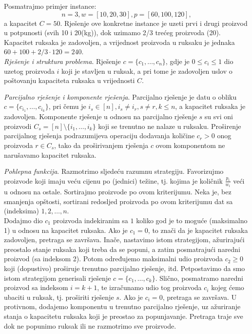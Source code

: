 \begin{solution}
	Posmatrajmo primjer instance: $$n = 3, w = [10, 20, 30], p = [60, 100, 120],$$  a 
	kapacitet $C = 50$.  Rješenje ove konkretne instance je uzeti prvi i drugi proizvod u potpunosti (svih 10 i
	20(kg)), dok uzimamo 2/3 trećeg proizvoda (20). Kapacitet ruksaka je zadovoljen,
	a vrijednost proizvoda u ruksaku je jednaka $60 + 100 + 2/3 \cdot  120
	= 240$. \\
	
    \textit{Rješenje i struktura problema}.  Rješenje $c = \{c_1,\ldots, c_n\}$, gdje je $0 \leq c_i \leq 1$ dio uzetog
    proizvoda $i$ koji je stavljen u ruksak, a pri tome je zadovoljen  uslov o poštovanju kapaciteta ruksaka u vrijednosti   $C$.
    
    \textit{Parcijalno rješenje i komponente rješenja}. Parcijalno rješenje je datu o obliku $c = \{ c_{i_1}, \ldots, c_{i_k}  \}$, pri čemu je $i_s \in [n],  i_s \neq i_r, s\neq r,   k \leq n$, a kapacitet ruksaka je zadovoljen. 
    Komponente rješenje u odnosu na parcijalno rješenje $s$ su svi oni proizvodi $C_s = [n] \setminus \{  {i_1}, \ldots, {i_k} \}$ koji se trenutno ne nalaze   u ruksaku. Proširenje parcijalnog rješenja podrazumijeva operaciju dodavanja  količine $c_r>0$ onog proizvoda $r \in C_s$, tako da proširivanjem rješenja $c$ ovom komponentom ne narušavamo kapacitet ruksaka. 
    
    \textit{Pohlepna funkcija}.  Razmotrimo sljedeću razumnu strategiju. Favorizujmo proizvode koji imaju veću cijenu po (jednici) težine, tj. kojima je količnik  $\frac{p_i}{w_i}$ veći u odnosu na ostale. Sortirajmo proizvode po ovom kriterijumu. Neka je, bez smanjenja opštosti, sortirani redosljed proizvoda po ovom kriterijumu dat sa (indeksima) $1,2, \ldots, n$.   \\
    
    
    Dodajmo dio $c_1$ proizvoda indekiranim sa $1$ koliko god je to moguće (maksimalno 1) u odnosu na kapacitet ruksaka. Ako je  $c_1 = 0$, to znači da je kapacitet ruksaka zadovoljen, pretraga se završava. Inače, nastavimo istom strategijom, ažurirajući preostalo stanje ruksaka koji treba da se popuni, a zatim posmatrajući naredni proizvod (sa indeksom 2). Potom određujemo maksimalni udio proizvoda $c_2\geq 0$ koji   (dopustivo) proširuje trenutno  parcijalno rješenje, itd. Petpostavimo da smo istom strategijom generisali rješenje $c = \{ c_{1}, \ldots, c_{k}\}$. %
     Slično, posmatramo naredni proizvod sa indeksom $i =  k+1$, te izračunamo udio tog proizvoda $c_{i}$ kojeg ćemo ubaciti u ruksak, tj. proširiti rješenje $s$. Ako je $c_i = 0$, pretraga se završava. U protivnom, dodajemo komponentu u trenutno parcijalno rješenje, uz ažuriranje stanja o kapacitetu ruksaka koji je preostao za popunjavanje. Pretraga traje sve dok ne popunimo ruksak ili ne razmotrimo sve proizvode.  
      

\end{solution}
